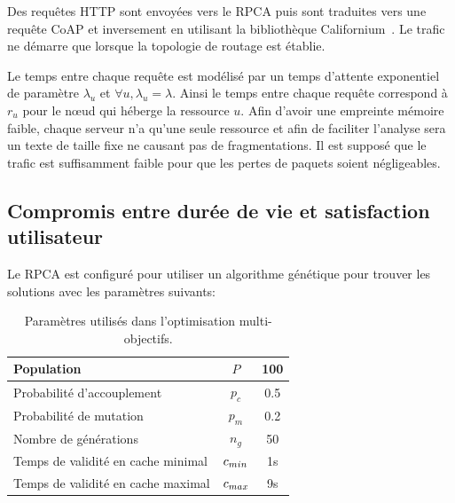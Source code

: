 Des requêtes \ac{HTTP} sont envoyées vers le \ac{RPCA} puis sont traduites vers une requête \ac{CoAP} et inversement en utilisant la bibliothèque Californium~\cite{kovatsch2014californium}.
Le trafic ne démarre que lorsque la topologie de routage est établie.

Le temps entre chaque requête est modélisé par un temps d'attente exponentiel de paramètre $\lambda_u$ et $\forall u, \lambda_u = \lambda$.
Ainsi le temps entre chaque requête correspond à $r_u$ pour le nœud qui héberge la ressource $u$.
Afin d'avoir une empreinte mémoire faible, chaque serveur n'a qu'une seule ressource et afin de faciliter l'analyse sera un texte de taille fixe ne causant pas de fragmentations.
Il est supposé que le trafic est suffisamment faible pour que les pertes de paquets soient négligeables.

\subsection{Compromis entre durée de vie et satisfaction utilisateur}

Le \ac{RPCA} est configuré pour utiliser un algorithme génétique pour trouver les solutions avec les paramètres suivants:

\begin{table}[ht]
\centering
\begin{tabular}{|l|c|c|}
\hline
Population & $P$ & 100 \\
\hline
Probabilité d'accouplement & $p_c$ & 0.5 \\
\hline
Probabilité de mutation & $p_m$ & 0.2 \\
\hline
Nombre de générations & $n_g$ & 50 \\
\hline
Temps de validité en cache minimal & $c_{min}$ & 1s \\
\hline
Temps de validité en cache maximal & $c_{max}$ & 9s \\
\hline
\end{tabular}
\caption{Paramètres utilisés dans l'optimisation multi-objectifs.}

\label{cache:table:nsga2_parameters}
\end{table}

